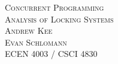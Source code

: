 \begin{titlepage}
\begin{center} 
\vspace*{2cm}
\textsc{\huge Concurrent Programming}\\[1cm]
\textsc{\LARGE Analysis of Locking Systems}\\[13cm]

\textsc{\large Andrew Kee}\\[0.25cm]
\textsc{\large Evan Schlomann} \\[0.25cm]
\textsc{ECEN 4003 / CSCI 4830}

\end{center}
\end{titlepage}